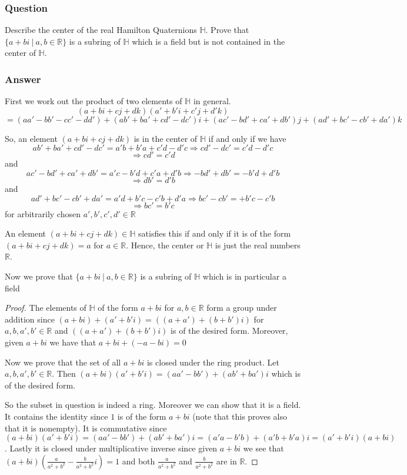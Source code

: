 \documentclass[12pt]{article}
\begin{document}
\subsubsection{Question}
Describe the center of the real Hamilton Quaternions $\mathbb{H}$. Prove that $\{a+bi\ |\ a,b\in\mathbb{R} \}$ is a subring of $\mathbb{H}$ which is a field but is not contained in the center of $\mathbb{H}$. 
\subsubsection{Answer}
First we work out the product of two elements of $\mathbb{H}$ in general.
\[(a+bi+cj+dk)(a'+b'i+c'j+d'k)\]
\[=(aa'-bb'-cc'-dd')+(ab'+ba'+cd'-dc')i+(ac'-bd'+ca'+db')j+(ad'+bc'-cb'+da')k\]

So, an element $(a+bi+cj+dk)$ is in the center of $\mathbb{H}$ if and only if we have 
\[ab'+ba'+cd'-dc'=a'b+b'a+c'd-d'c \Rightarrow cd'-dc'=c'd-d'c   \]
\[\Rightarrow  cd'=c'd   \]
and
\[ac'-bd'+ca'+db'= a'c-b'd+c'a+d'b \Rightarrow -bd'+db'= -b'd+d'b \]
\[\Rightarrow db'= d'b\]
and
\[ad'+bc'-cb'+da'=a'd+b'c-c'b+d'a \Rightarrow bc'-cb'=+b'c-c'b \]
\[\Rightarrow bc'=b'c\]
for arbitrarily chosen $a',b',c',d' \in \mathbb{R}$

An element $(a+bi+cj+dk) \in \mathbb{H}$ satisfies this if and only if it is of the form $(a+bi+cj+dk) = a$ for $a \in \mathbb{R}$. Hence, the center or $\mathbb{H}$ is just the real numbers $\mathbb{R}$.

Now we prove that $\{a+bi\ |\ a,b\in\mathbb{R} \}$ is a subring of $\mathbb{H}$ which is in particular a field
\begin{proof}The elements of $\mathbb{H}$ of the form $a+bi$ for $a,b\in \mathbb{R}$ form a group under addition since $(a+bi)+(a'+b'i)=((a+a')+(b+b')i)$ for $a,b,a',b' \in \mathbb{R}$ and $((a+a')+(b+b')i)$ is of the desired form. Moreover, given $a+bi$ we have that $a+bi+(-a-bi)=0$

Now we prove that the set of all $a+bi$ is closed under the ring product. Let $a,b,a',b' \in \mathbb{R}$. Then $(a+bi)(a'+b'i)= (aa'-bb')+(ab'+ba')i$ which is of the desired form.

So the subset in question is indeed a ring. Moreover we can show that it is a field.  It contains the identity since $1$ is of the form $a+bi$ (note that this proves also that it is nonempty). It is commutative since $(a+bi)(a'+b'i)= (aa'-bb')+(ab'+ba')i= (a'a-b'b)+(a'b+b'a)i=(a'+b'i)(a+bi)$. Lastly it is closed under multiplicative inverse since given $a+bi$ we see that $(a+bi)(\frac{a}{a^2+b^2}-\frac{b}{a^2+b^2}i)=1$ and both $\frac{a}{a^2+b^2}$ and $\frac{b}{a^2+b^2}$ are in $\mathbb{R}$.\end{proof}
\end{document}
